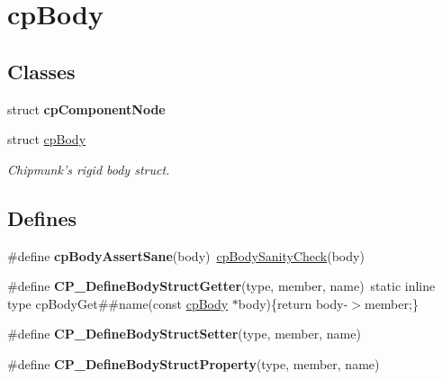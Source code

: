 \hypertarget{group__cp_body}{\section{cp\-Body}
\label{group__cp_body}
}
\subsection*{Classes}
\begin{DoxyCompactItemize}
\item 
struct {\bfseries cp\-Component\-Node}
\item 
struct \hyperlink{structcp_body}{cp\-Body}
\begin{DoxyCompactList}\small\item\em Chipmunk's rigid body struct. \end{DoxyCompactList}\end{DoxyCompactItemize}
\subsection*{Defines}
\begin{DoxyCompactItemize}
\item 
\hypertarget{group__cp_body_ga135d8e824aade5d6923910593cfb1b4e}{\#define {\bfseries cp\-Body\-Assert\-Sane}(body)~\hyperlink{group__cp_body_ga21607229d9fd49281a7a94a1b09664de}{cp\-Body\-Sanity\-Check}(body)}\label{group__cp_body_ga135d8e824aade5d6923910593cfb1b4e}

\item 
\hypertarget{group__cp_body_ga40c9bac4cf4b0637f64cb53402413d68}{\#define {\bfseries C\-P\-\_\-\-Define\-Body\-Struct\-Getter}(type, member, name)~static inline type cp\-Body\-Get\#\#name(const \hyperlink{structcp_body}{cp\-Body} $\ast$body)\{return body-\/$>$member;\}}\label{group__cp_body_ga40c9bac4cf4b0637f64cb53402413d68}

\item 
\#define {\bfseries C\-P\-\_\-\-Define\-Body\-Struct\-Setter}(type, member, name)
\item 
\#define {\bfseries C\-P\-\_\-\-Define\-Body\-Struct\-Property}(type, member, name)
\end{DoxyCompactItemize}
